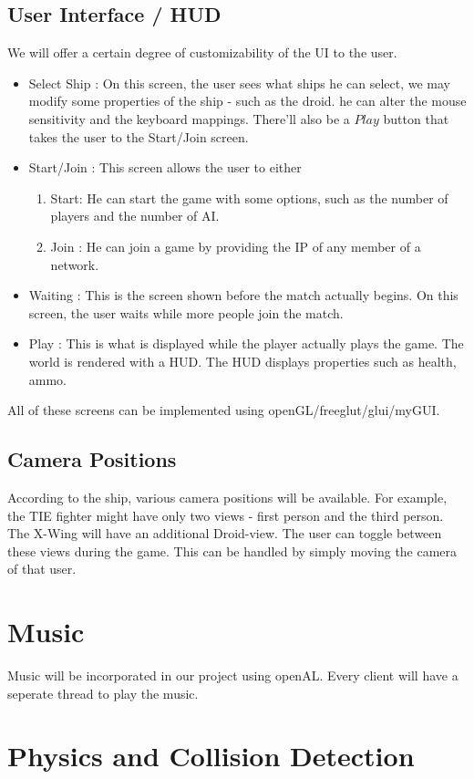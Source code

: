 \documentclass[]{article}
\begin{document}
\subsection{User Interface / HUD}
We will offer a certain degree of customizability of the UI to the user. 
\begin{itemize}
\item Select Ship : On this screen, the user sees what ships he can select, we may modify some properties of the ship - such as the droid. he can alter the mouse sensitivity and the keyboard mappings. There'll also be a $Play$ button that takes the user to the Start/Join screen.
\item Start/Join : This screen allows the user to either
	\begin{enumerate}
	\item Start: He can start the game with some options, such as the number of players and the number of AI.
	\item Join : He can join a game by providing the IP of any member of a network.
	\end{enumerate}
\item Waiting : This is the screen shown before the match actually begins. On this screen, the user waits while more people join the match.
	\item Play : This is what is displayed while the player actually plays the game. The world is rendered with a HUD. The HUD displays properties such as health, ammo.	
\end{itemize}

All of these screens can be implemented using openGL/freeglut/glui/myGUI. %
\subsection{Camera Positions}
According to the ship, various camera positions will be available. For example, the TIE fighter might have only two views - first person and the third person. The X-Wing will have an additional Droid-view. The user can toggle between these views during the game. This can be handled by simply moving the camera of that user.
\section{Music}
Music will be incorporated in our project using openAL. Every client will have a seperate thread to play the music.
\section{Physics and Collision Detection}
\end{document}
